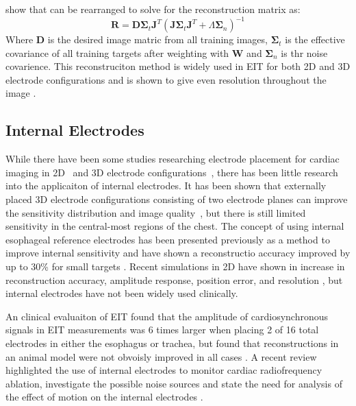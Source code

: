  show that  can 
be rearranged to solve for the reconstruction matrix
as:
\begin{equation} 
	\mathbf{R} = \mathbf{D}  
	\mathbf{\Sigma}_t \mathbf{J}^T(\mathbf{J}  
	 \mathbf{\Sigma}_t  \mathbf{J}^T + 
	 \Lambda \mathbf{\Sigma}_n)^{-1}
\end{equation}
Where $\mathbf{D}$ is the desired image matric from all training images,
$\mathbf{\Sigma}_t$  is the effective covariance of all training targets after weighting with 
$\mathbf{W}$ and 
$\mathbf{\Sigma}_n$ is thr noise covarience. 
This reconstruciton method is widely used in EIT for both 2D and 3D electrode configurations 
and is shown to give even resolution throughout the image \parencite{adler_greit_2009}.

\subsection{Internal Electrodes}

While there have been some studies researching electrode placement for cardiac
imaging in 2D~\parencite{vonk_noordegraaf_improvement_1996} and 
3D electrode configurations~\parencite{graham_electrode_2007}, there has 
been little research into the applicaiton of internal electrodes. 
It has been shown that externally placed 3D electrode configurations
consisting of two electrode planes
can improve the sensitivity distribution and image quality~\parencite{Grychtol2016},
but there is still limited sensitivity in the central-most regions 
of the chest.
The concept of using internal esophageal reference electrodes has been presented
previously
\parencite{Pilkington1989,Schuessler1995}
as a method to improve internal sensitivity and have 
shown a reconstructio accuracy improved by up to 30\% for small 
targets \parencite{pilkington_utilization_1989}.
Recent simulations in 2D have shown in increase in reconstruction 
accuracy, amplitude response, position error, and resolution
\parencite{nasehi_tehrani_modelling_2012,nasehi_tehrani_evaluation_2012},
but internal electrodes have not been widely used clinically. 

An clinical evaluaiton of EIT found that the amplitude of cardiosynchronous signals 
in EIT measurements was 6 times larger when placing 2 of 16 total electrodes in 
either the esophagus or trachea, but found that reconstructions 
in an animal model were not obvoisly improved in all cases \parencite{czaplik_application_2014}.
A recent review highlighted the use of internal electrodes to monitor cardiac radiofrequency
ablation, investigate the possible noise sources and 
state the need for analysis of the effect of motion on the 
internal electrodes
\parencite{nguyen_electrical_2020}.

